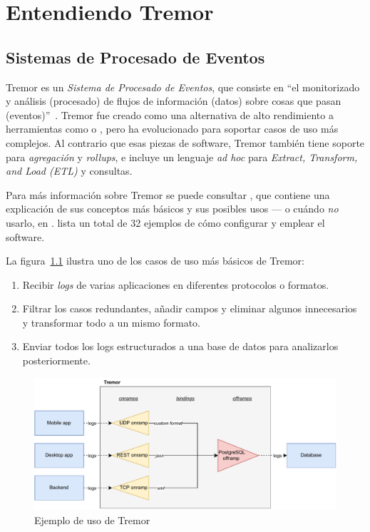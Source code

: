 
\chapter{Entendiendo Tremor}\label{ch:tremor}

\section{Sistemas de Procesado de Eventos}

Tremor es un \emph{Sistema de Procesado de Eventos}, que consiste en ``el
monitorizado y análisis (procesado) de flujos de información (datos) sobre cosas
que pasan (eventos)''~\cite{luckham2011event}. Tremor fue creado como una
alternativa de alto rendimiento a herramientas como \textcite{logstash} o
\textcite{telegraf}, pero ha evolucionado para soportar casos de uso más
complejos. Al contrario que esas piezas de software, Tremor también tiene
soporte para \emph{agregación} y \emph{rollups}, e incluye un lenguaje \emph{ad
hoc} para \emph{Extract, Transform, and Load (ETL)} y consultas.

Para más información sobre Tremor se puede consultar \textcite{tremorintro}, que
contiene una explicación de sus conceptos más básicos y sus posibles usos --- o
cuándo \emph{no} usarlo, en \textcite{tremorconstraints}.
\textcite{tremorrecipes} lista un total de 32 ejemplos de cómo configurar y
emplear el software.

La figura~\ref{fig:tremor_example} ilustra uno de los casos de uso más básicos
de Tremor:

\begin{enumerate}
    \item Recibir \emph{logs} de varias aplicaciones en diferentes protocolos o
        formatos.
    \item Filtrar los casos redundantes, añadir campos y eliminar algunos
        innecesarios y transformar todo a un mismo formato.
    \item Enviar todos los logs estructurados a una base de datos para
        analizarlos posteriormente.
\end{enumerate}

\begin{figure}
    \centering
    \includegraphics[width=\textwidth]{./Imagenes/example.pdf}
    \caption{Ejemplo de uso de Tremor}%
    \label{fig:tremor_example}
\end{figure}

